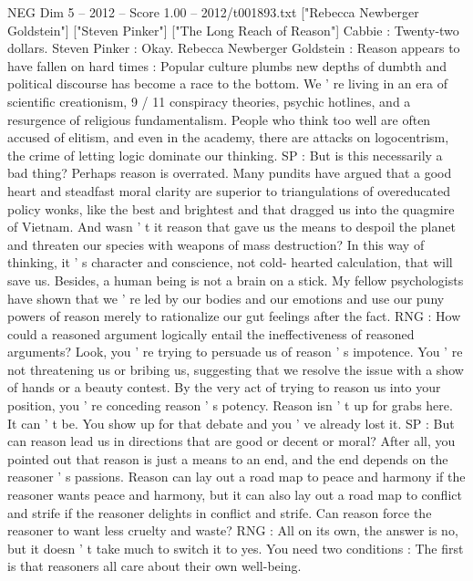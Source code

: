 \begin{textsample}{NEG Dim 5 – 2012 – Score 1.00 – 2012/t001893.txt}  \label{ex:f5_neg_045}
["Rebecca Newberger Goldstein"] ["Steven Pinker"] ["The Long Reach of Reason"] Cabbie : Twenty-two dollars.
Steven Pinker : Okay.
Rebecca Newberger Goldstein : Reason appears to have fallen on hard times : Popular culture plumbs new depths of dumbth and political discourse has become a race to the bottom.
We ' re living in an era of scientific creationism, 9 / 11 conspiracy theories, psychic hotlines, and a resurgence of religious fundamentalism.
People who think too well are often accused of elitism, and even in the academy, there are attacks on logocentrism, the crime of letting logic dominate our thinking.
SP : But is this necessarily a bad thing?
Perhaps reason is overrated.
Many pundits have argued that a good heart and steadfast moral clarity are superior to triangulations of overeducated policy wonks, like the best and brightest and that dragged us into the quagmire of Vietnam.
And wasn ' t it reason that gave us the means to despoil the planet and threaten our species with weapons of mass destruction?
In this way of thinking, it ' s character and conscience, not cold- hearted calculation, that will save us.
Besides, a human being is not a brain on a stick.
My fellow psychologists have shown that we ' re led by our bodies and our emotions and use our puny powers of reason merely to rationalize our gut feelings after the fact.
RNG : How could a reasoned argument logically entail the ineffectiveness of reasoned arguments?
Look, you ' re trying to persuade us of reason ' s impotence.
You ' re not threatening us or bribing us, suggesting that we resolve the issue with a show of hands or a beauty contest.
By the very act of trying to reason us into your position, you ' re conceding reason ' s potency.
Reason isn ' t up for grabs here.
It can ' t be.
You show up for that debate and you ' ve already lost it.
SP : But can reason lead us in directions that are good or decent or moral?
After all, you pointed out that reason is just a means to an end, and the end depends on the reasoner ' s passions.
Reason can lay out a road map to peace and harmony if the reasoner wants peace and harmony, but it can also lay out a road map to conflict and strife if the reasoner delights in conflict and strife.
Can reason force the reasoner to want less cruelty and waste?
RNG : All on its own, the answer is no, but it doesn ' t take much to switch it to yes.
You need two conditions : The first is that reasoners all care about their own well-being.

\end{textsample}
